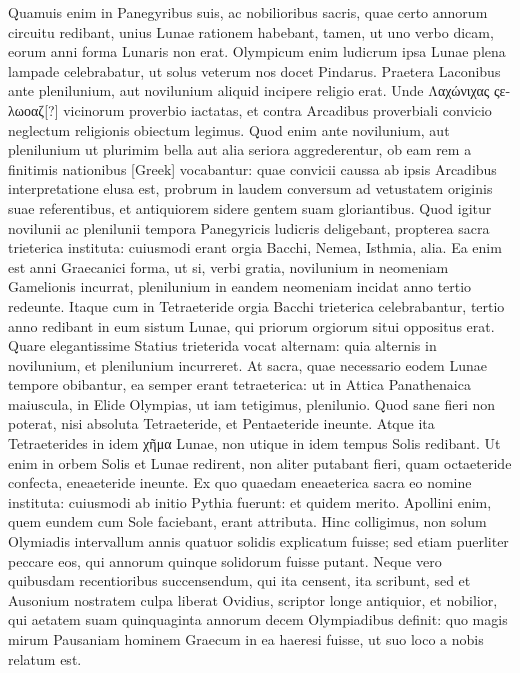 Quamuis enim in
Panegyribus suis, ac nobilioribus sacris, quae certo annorum circuitu
redibant, unius Lunae rationem habebant, tamen, ut uno verbo
dicam, eorum anni forma Lunaris non erat.
Olympicum enim ludicrum
ipsa Lunae plena lampade celebrabatur, ut solus veterum nos
docet Pindarus. 
Praetera Laconibus ante plenilunium, aut novilunium
aliquid incipere religio erat.
Unde \textgreek{Λαχώνιχας ςελωοαζ}[?] vicinorum
proverbio iactatas, et contra Arcadibus proverbiali convicio
neglectum religionis obiectum legimus. 
Quod enim ante novilunium,
aut plenilunium ut plurimim bella aut alia seriora aggrederentur,
ob eam rem a finitimis nationibus \textgreek{[Greek]} vocabantur:
quae convicii caussa ab ipsis Arcadibus interpretatione elusa est,
probrum in laudem conversum ad vetustatem originis suae referentibus,
et antiquiorem sidere gentem suam gloriantibus. 
Quod igitur
novilunii ac plenilunii tempora Panegyricis ludicris deligebant,
propterea sacra trieterica instituta: cuiusmodi erant orgia Bacchi,
Nemea, Isthmia, alia.
Ea enim est anni Graecanici forma, ut si, verbi
gratia, novilunium in neomeniam Gamelionis incurrat, plenilunium
in eandem neomeniam incidat anno tertio redeunte.
Itaque
cum in Tetraeteride orgia Bacchi trieterica celebrabantur, tertio
anno redibant in eum sistum Lunae, qui priorum orgiorum situi oppositus
erat.
Quare elegantissime Statius trieterida vocat alternam:
quia alternis in novilunium, et plenilunium incurreret.
At sacra,
quae necessario eodem Lunae tempore obibantur, ea semper erant
tetraeterica: ut in Attica Panathenaica maiuscula, in Elide Olympias,
ut iam tetigimus, plenilunio.
\lnr{}Quod sane fieri non poterat, nisi absoluta
Tetraeteride, et Pentaeteride ineunte.
Atque ita Tetraeterides
in idem \textgreek{χῆμα} Lunae, non utique in idem tempus Solis redibant.
Ut
enim in orbem Solis et Lunae redirent, non aliter putabant fieri,
quam octaeteride confecta, eneaeteride ineunte.
Ex quo quaedam
eneaeterica sacra eo nomine instituta: cuiusmodi ab initio Pythia
fuerunt: et quidem merito.
Apollini enim, quem eundem cum Sole
faciebant, erant attributa.
Hinc colligimus, non solum Olymiadis
intervallum annis quatuor solidis explicatum fuisse; sed etiam puerliter
peccare eos, qui annorum quinque solidorum fuisse putant.
Neque vero quibusdam recentioribus succensendum, qui ita censent,
ita scribunt, sed et Ausonium nostratem culpa liberat Ovidius, scriptor
longe antiquior, et nobilior, qui aetatem suam quinquaginta annorum
decem Olympiadibus definit: quo magis mirum Pausaniam
hominem Graecum in ea haeresi fuisse, ut suo loco a nobis relatum est.
{}

